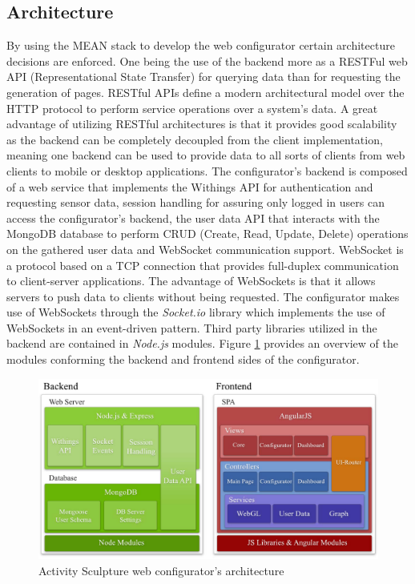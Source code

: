 \documentclass[../medieninformatik-arbeit.tex]{subfiles}
\begin{document}
\subsection{Architecture}
By using the MEAN stack to develop the web configurator certain architecture decisions are enforced. One being the use of the backend more as a RESTFul web API (Representational State Transfer) for querying data than for requesting the generation of pages. RESTful APIs define a modern architectural model over the HTTP protocol to perform service operations over a system's data\cite{Fielding:2000:PDM:337180.337228}. A great advantage of utilizing RESTful architectures is that it provides good scalability as the backend can be completely decoupled from the client implementation, meaning one backend can be used to provide data to all sorts of clients from web clients to mobile or desktop applications. The configurator's backend is composed of a web service that implements the Withings API for authentication and requesting sensor data, session handling for assuring only logged in users can access the configurator's backend, the user data API that interacts with the MongoDB database to perform CRUD (Create, Read, Update, Delete) operations on the gathered user data and WebSocket communication support. WebSocket is a protocol based on a TCP connection that provides full-duplex communication to client-server applications\cite{fette2011websocket}. The advantage of WebSockets is that it allows servers to push data to clients without being requested. The configurator makes use of WebSockets through the \textit{Socket.io}\cite{socketio} library which implements the use of WebSockets in an event-driven pattern. Third party libraries utilized in the backend are contained in \textit{Node.js} modules. Figure \ref{fig:architecture} provides an overview of the modules conforming the backend and frontend sides of the configurator.  

\begin{figure}[h]
\captionsetup{width=\textwidth}
\begin{center}
  \includegraphics[width=\textwidth]{Configurator/img/Architecture}
  \caption{Activity Sculpture web configurator's architecture}
\label{fig:architecture}
\end{center}
\end{figure}
\end{document}
